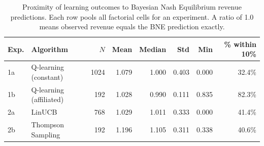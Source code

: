 \begin{table}[H]
\centering
\caption{Proximity of learning outcomes to Bayesian Nash Equilibrium revenue predictions. Each row pools all factorial cells for an experiment. A ratio of 1.0 means observed revenue equals the BNE prediction exactly.}
\label{tab:bne_convergence}
\begin{tabular}{llrrrrrr}
\toprule
\textbf{Exp.} & \textbf{Algorithm} & \textbf{$N$} & \textbf{Mean} & \textbf{Median} & \textbf{Std} & \textbf{Min} & \textbf{\% within 10\%} \\
\midrule
1a & Q-learning (constant) & 1024 & 1.079 & 1.000 & 0.403 & 0.000 & 32.4\% \\
1b & Q-learning (affiliated) & 192 & 1.028 & 0.990 & 0.111 & 0.835 & 82.3\% \\
2a & LinUCB & 768 & 1.029 & 1.011 & 0.333 & 0.000 & 41.4\% \\
2b & Thompson Sampling & 192 & 1.196 & 1.105 & 0.311 & 0.338 & 40.6\% \\
\bottomrule
\end{tabular}
\end{table}
